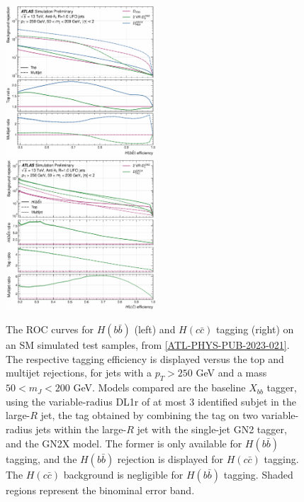 \begin{center}
  \begin{figure}[h!]
  \centerline{
  \includegraphics[width=0.50\textwidth]{Images/FTAG/GN2X/roc/rocHbb.pdf}
  \includegraphics[width=0.50\textwidth]{Images/FTAG/GN2X/roc/rocHcc.pdf}
  }
  \caption{The ROC curves for $H(b\bar{b})$ (left) and $H(c\bar{c})$ tagging (right) on an SM simulated test samples, from \ref{ATL-PHYS-PUB-2023-021}. The respective tagging efficiency is displayed versus the top and multijet rejections, for jets with a $p_T > 250$ GeV and a mass $50 < m_J < 200$ GeV. Models compared are the baseline $X_{bb}$ tagger, using the variable-radius DL1r of at most 3 identified subjet in the large-$R$ jet, the tag obtained by combining the tag on two variable-radius jets within the large-$R$ jet with the single-jet GN2 tagger, and the GN2X model. The former is only available for $H(b\bar{b})$ tagging, and the $H(b\bar{b})$ rejection is displayed for $H(c\bar{c})$ tagging. The $H(c\bar{c})$ background is negligible for $H(b\bar{b})$ tagging. Shaded regions represent the binominal error band.}
  \label{fig:rocGN2X}
  \end{figure}
\end{center}

